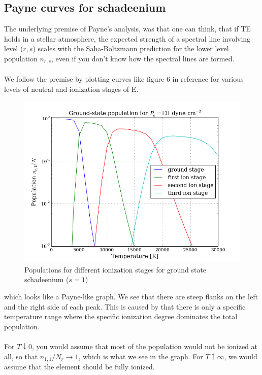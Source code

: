 \documentclass{article}
\begin{document}
\subsection{Payne curves for schadeenium}
The underlying premise of Payne's analysis, was that one can think, that if TE holds in a stellar atmosphere, the expected strength of a spectral line involving level ($r,s$) scales with the Saha-Boltzmann prediction for the lower level population $n_{r,s}$, even if you don't know how the spectral lines are formed.\\\\
We follow the premise by plotting curves like figure 6 in reference \cite{cite:ssa} for various levels of neutral and ionization stages of E.
\begin{figure}[H]
  \centering
  \includegraphics[scale=0.5]{schadeenium_pop.png}
  \caption{Populations for different ionization stages for ground state schadeenium ($s=1$)}
  \label{fig:payne}
\end{figure}
which looks like a Payne-like graph. We see that there are steep flanks on the left and the right side of each peak. This is caused by that there is only a specific temperature range where the specific ionization degree dominates the total population.\\\\
For $T\downarrow 0$, you would assume that most of the population would not be ionized at all, so that $n_{1,1}/N_r \rightarrow 1$, which is what we see in the graph. For $T\uparrow\infty$, we would assume that the element should be fully ionized.\\\\
\end{document}
